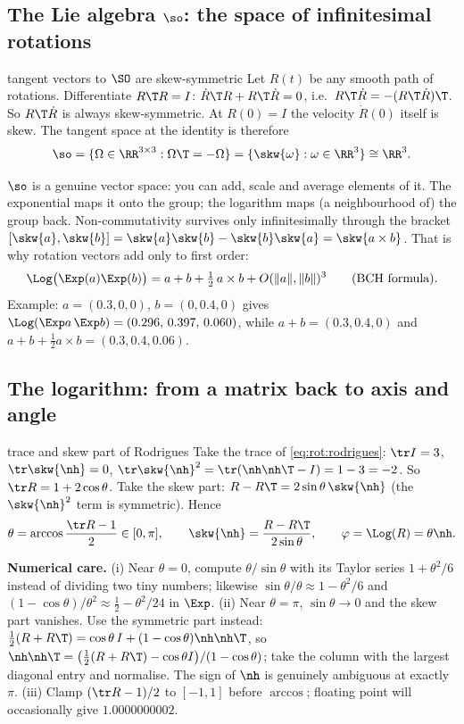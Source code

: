 \subsection{The Lie algebra $\so$: the space of infinitesimal rotations}\label{sec:rot:lie}\label{sec:rot:lie-algebra-space}
\begin{deriv}{tangent vectors to $\SO$ are skew-symmetric}
Let $R(t)$ be any smooth path of rotations. Differentiate $R\T R=I$: $\dot R\T R+R\T\dot R=0$, i.e.\ $R\T\dot R=-(R\T\dot R)\T$. So $R\T\dot R$ is always skew-symmetric. At $R(0)=I$ the velocity $\dot R(0)$ itself is skew. The tangent space at the identity is therefore
\[
\so=\{\Omega\in\RR^{3\times3}:\Omega\T=-\Omega\}=\{\skw{\omega}:\omega\in\RR^3\}\cong\RR^3 .
\]
\end{deriv}
$\so$ is a genuine vector space: you can add, scale and average elements of it. The exponential maps it onto the group; the logarithm maps (a neighbourhood of) the group back. Non-commutativity survives only infinitesimally through the bracket $[\skw{a},\skw{b}]=\skw{a}\skw{b}-\skw{b}\skw{a}=\skw{a\times b}$. That is why rotation vectors add only to first order:
\begin{equation}
\Log\big(\Exp(a)\Exp(b)\big)=a+b+\tfrac12\,a\times b+O(\|a\|,\|b\|)^3\qquad\text{(BCH formula).}\label{eq:rot:bch}
\end{equation}
Example: $a=(0.3,0,0)$, $b=(0,0.4,0)$ gives $\Log(\Exp a\,\Exp b)=(0.296,\,0.397,\,0.060)$, while $a+b=(0.3,0.4,0)$ and $a+b+\tfrac12a\times b=(0.3,0.4,0.06)$.

\subsection{The logarithm: from a matrix back to axis and angle}\label{sec:rot:log}\label{sec:rot:logarithm-matrix-back}
\begin{deriv}{trace and skew part of Rodrigues}
Take the trace of \eqref{eq:rot:rodrigues}: $\tr I=3$, $\tr\skw{\nh}=0$, $\tr\skw{\nh}^2=\tr(\nh\nh\T-I)=1-3=-2$. So $\tr R=1+2\cos\theta$. Take the skew part: $R-R\T=2\sin\theta\,\skw{\nh}$ (the $\skw{\nh}^2$ term is symmetric). Hence
\[
\theta=\arccos\frac{\tr R-1}{2}\in[0,\pi],\qquad \skw{\nh}=\frac{R-R\T}{2\sin\theta},\qquad \varphi=\Log(R)=\theta\nh .
\]
\end{deriv}
\textbf{Numerical care.} (i) Near $\theta=0$, compute $\theta/\sin\theta$ with its Taylor series $1+\theta^2/6$ instead of dividing two tiny numbers; likewise $\sin\theta/\theta\approx1-\theta^2/6$ and $(1-\cos\theta)/\theta^2\approx\frac12-\theta^2/24$ in $\Exp$. (ii) Near $\theta=\pi$, $\sin\theta\to0$ and the skew part vanishes. Use the symmetric part instead: $\frac12(R+R\T)=\cos\theta\,I+(1-\cos\theta)\nh\nh\T$, so $\nh\nh\T=\big(\tfrac12(R+R\T)-\cos\theta I\big)/(1-\cos\theta)$; take the column with the largest diagonal entry and normalise. The sign of $\nh$ is genuinely ambiguous at exactly $\pi$. (iii) Clamp $(\tr R-1)/2$ to $[-1,1]$ before $\arccos$; floating point will occasionally give $1.0000000002$.

